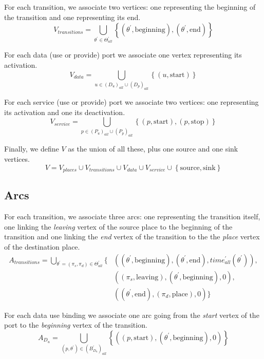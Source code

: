 For each transition, we associate two vertices: one representing the
beginning of the transition and one representing its end. 
\[
V_{transitions}=\bigcup_{\theta^{\prime}\in\Theta_{all}^{\prime}}\left\{ \left(\theta^{\prime},\text{beginning}\right),\left(\theta^{\prime},\text{end}\right)\right\} 
\]

For each data (use or provide) port we associate one vertex representing
its activation. 
\[
V_{data}=\bigcup_{u\in\left(D_{u}\right)_{all}\cup\left(D_{p}\right)_{all}}\left\{ \left(u,\text{start}\right)\right\} 
\]

For each service (use or provide) port we associate two vertices:
one representing its activation and one its deactivation. 
\[
V_{service}=\bigcup_{p\in\left(P_{u}\right)_{all}\cup\left(P_{p}\right)_{all}}\left\{ \left(p,\text{start}\right),\left(p,\text{stop}\right)\right\} 
\]

Finally, we define $V$ as the union of all these, plus one source
and one sink vertices. 
\[
V=V_{places}\cup V_{transitions}\cup V_{data}\cup V_{service}\cup\left\{ \text{source},\text{sink}\right\} 
\]


\subsection{Arcs}

For each transition, we associate three arcs: one representing the
transition itself, one linking the \emph{leaving} vertex of the source
place to the beginning of the transition and one linking the \emph{end}
vertex of the transition to the the \emph{place} vertex of the destination
place. 
\begin{align*}
A_{transitions}=\bigcup_{\theta^{\prime}=\left(\pi_{s},\pi_{d}\right)\in\Theta_{all}^{\prime}}\{ & \left(\left(\theta^{\prime},\text{beginning}\right),\left(\theta^{\prime},\text{end}\right),time_{all}^{\prime}\left(\theta^{\prime}\right)\right),\\
 & \left(\left(\pi_{s},\text{leaving}\right),\left(\theta^{\prime},\text{beginning}\right),0\right),\\
 & \left(\left(\theta^{\prime},\text{end}\right),\left(\pi_{d},\text{place}\right),0\right)\}
\end{align*}

For each data use binding we associate one arc going from the \emph{start}
vertex of the port to the \emph{beginning} vertex of the transition.
\[
A_{D_{u}}=\bigcup_{\left(p,\theta^{\prime}\right)\in\left(B_{D_{u}}^{\prime}\right)_{all}}\left\{ \left(\left(p,\text{start}\right),\left(\theta^{\prime},\text{beginning}\right),0\right)\right\} 
\]

